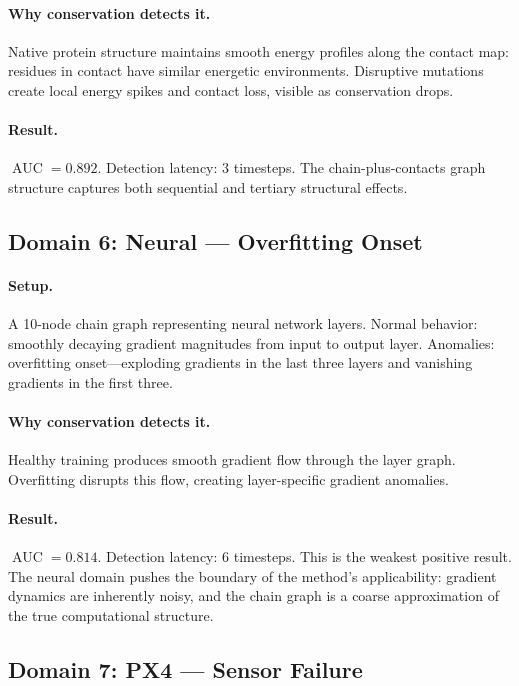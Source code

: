 \documentclass[11pt,a4paper]{article}
\DeclareMathOperator{\AUC}{AUC}
\begin{document}
\paragraph{Why conservation detects it.} Native protein structure maintains
smooth energy profiles along the contact map: residues in contact have similar
energetic environments.  Disruptive mutations create local energy spikes and
contact loss, visible as conservation drops.

\paragraph{Result.} $\AUC = 0.892$.  Detection latency: 3 timesteps.  The
chain-plus-contacts graph structure captures both sequential and tertiary
structural effects.

\subsection{Domain 6: Neural --- Overfitting Onset}

\paragraph{Setup.} A 10-node chain graph representing neural network layers.
Normal behavior: smoothly decaying gradient magnitudes from input to output
layer.  Anomalies: overfitting onset---exploding gradients in the last three
layers and vanishing gradients in the first three.

\paragraph{Why conservation detects it.} Healthy training produces smooth
gradient flow through the layer graph.  Overfitting disrupts this flow,
creating layer-specific gradient anomalies.

\paragraph{Result.} $\AUC = 0.814$.  Detection latency: 6 timesteps.  This is
the weakest positive result.  The neural domain pushes the boundary of the
method's applicability: gradient dynamics are inherently noisy, and the
chain graph is a coarse approximation of the true computational structure.

\subsection{Domain 7: PX4 --- Sensor Failure}
\end{document}
